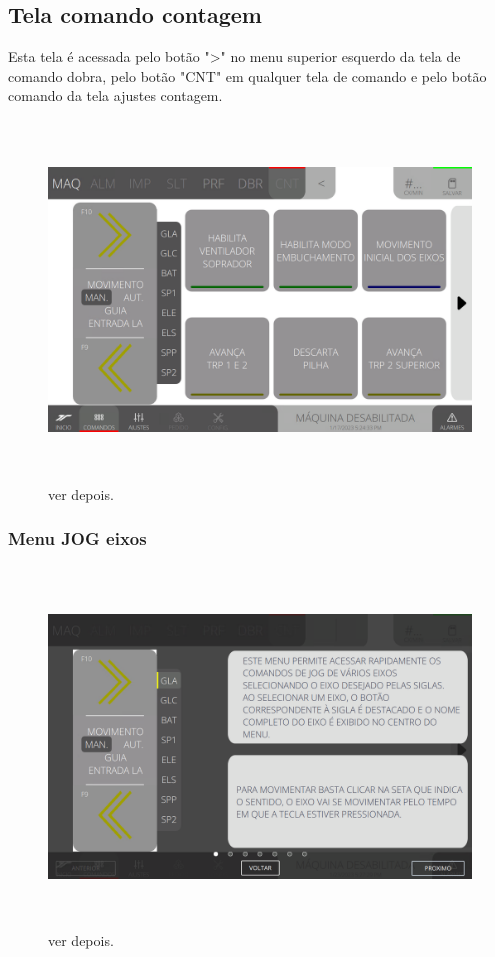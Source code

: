 \thispagestyle{fancy}
\vspace*{\fill}
\subsection{Tela comando contagem}
 Esta tela é acessada pelo botão "\textgreater" no menu superior esquerdo da tela de comando dobra, pelo botão "CNT" em qualquer tela de comando e pelo botão comando da tela ajustes contagem.
\begin{figure}[h]
  \centering
  \includegraphics[width=576px,height=360px]{src/imagesFlexo/08-count/commands/e-Tela-Principal.png}
  \caption{ver depois.}
   \label{}
\end{figure}

\newpage
\thispagestyle{fancy}
\vspace*{\fill}
\subsubsection{\small{Menu JOG eixos}}
\begin{figure}[h]
  \centering
  \includegraphics[width=576px,height=360px]{src/imagesFlexo/08-count/commands/e-1.png}
  \caption{ver depois.}
   \label{}
\end{figure}
\vspace*{\fill}

